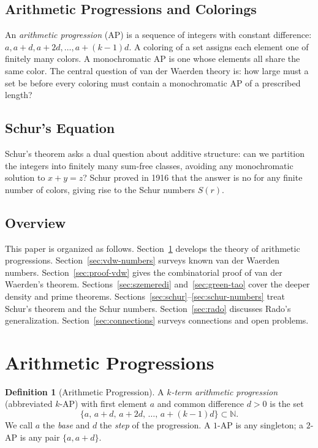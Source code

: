 \documentclass[12pt,a4paper]{amsart}
\theoremstyle{definition}
\newtheorem{definition}[theorem]{Definition}
\newcommand{\N}{\mathbb{N}}
\begin{document}
\subsection*{Arithmetic Progressions and Colorings}

An \emph{arithmetic progression} (AP) is a sequence of integers with constant difference:
$a, a+d, a+2d, \ldots, a+(k-1)d$. A coloring of a set assigns each element one of
finitely many colors. A monochromatic AP is one whose elements all share the same color.
The central question of van der Waerden theory is: how large must a set be before every
coloring must contain a monochromatic AP of a prescribed length?

\subsection*{Schur's Equation}

Schur's theorem asks a dual question about additive structure: can we partition the
integers into finitely many sum-free classes, avoiding any monochromatic solution to
$x + y = z$? Schur proved in 1916 that the answer is no for any finite number of
colors, giving rise to the Schur numbers $S(r)$.

\subsection*{Overview}

This paper is organized as follows. Section~\ref{sec:ap} develops the theory of
arithmetic progressions. Section~\ref{sec:vdw-numbers} surveys known van der Waerden
numbers. Section~\ref{sec:proof-vdw} gives the combinatorial proof of van der Waerden's
theorem. Sections~\ref{sec:szemeredi} and~\ref{sec:green-tao} cover the deeper density
and prime theorems. Sections~\ref{sec:schur}--\ref{sec:schur-numbers} treat Schur's
theorem and the Schur numbers. Section~\ref{sec:rado} discusses Rado's generalization.
Section~\ref{sec:connections} surveys connections and open problems.

\section{Arithmetic Progressions}\label{sec:ap}

\begin{definition}[Arithmetic Progression]
A \emph{$k$-term arithmetic progression} (abbreviated $k$-AP) with first element $a$
and common difference $d > 0$ is the set
\[
  \{a, \, a+d, \, a+2d, \, \ldots, \, a+(k-1)d\} \subset \N.
\]
We call $a$ the \emph{base} and $d$ the \emph{step} of the progression.
A $1$-AP is any singleton; a $2$-AP is any pair $\{a, a+d\}$.
\end{definition}
\end{document}
